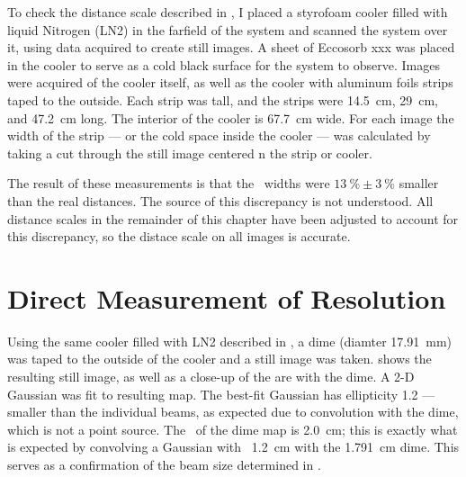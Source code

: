 To check the distance scale described in , I placed a styrofoam cooler filled with liquid Nitrogen (LN2) in the farfield of the system and scanned the system over it, using data acquired to create still images.
A sheet of Eccosorb xxx was placed in the cooler to serve as a cold black surface for the system to observe.
Images were acquired of the cooler itself, as well as the cooler with aluminum foils strips taped to the outside.
Each strip was  tall, and the strips were \SI{14.5}{\cm}, \SI{29}{\cm}, and \SI{47.2}{\cm} long.
The interior of the cooler is \SI{67.7}{\cm} wide.
For each image the \FWHM width of the strip --- or the cold space inside the cooler --- was calculated by taking a cut through the still image centered n the strip or cooler.

The result of these measurements is that the \FWHM\ widths were $\SI{13}{\percent} \pm \SI{3}{\percent}$ smaller than the real distances. The source of this discrepancy is not understood.
All distance scales in the remainder of this chapter have been adjusted to account for this discrepancy, so the distace scale on all images is accurate.




\section{Direct Measurement of Resolution}

Using the same cooler filled with LN2 described in , a dime (diamter \SI{17.91}{\mm}) was taped to the outside of the cooler and a still image was taken.
 shows the resulting still image, as well as a close-up of the are with the dime.
A 2-D Gaussian was fit to resulting map.
The best-fit Gaussian has ellipticity 1.2 --- smaller than the individual beams, as expected due to convolution with the dime, which is not a point source.
The \FWHM\ of the dime map is \SI{2.0}{\cm}; this is exactly what is expected by convolving a Gaussian with \FWHM\ \SI{1.2}{\cm} with the \SI{1.791}{\cm} dime.
This serves as a confirmation of the beam size determined in .

